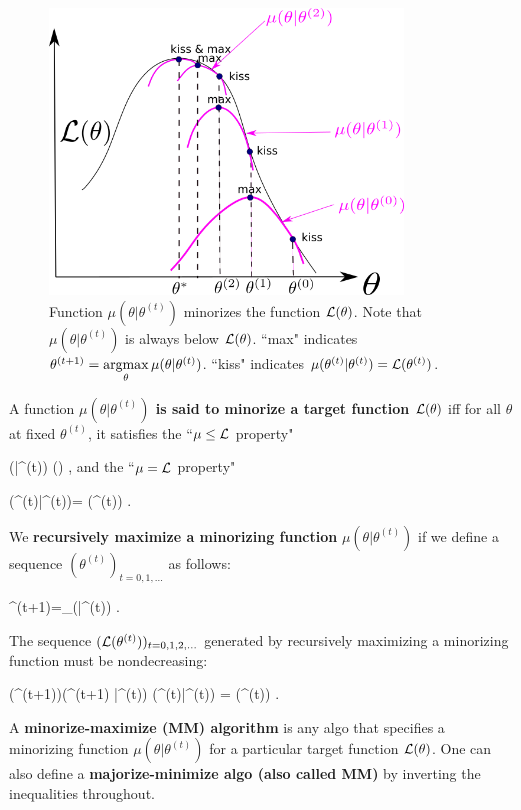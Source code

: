 \begin{figure}[h!]
\centering
\includegraphics[width=3.7in]
{emax/minorize.png}
\caption{Function $\mu(\theta|\theta^{(t)})$
minorizes the function ${\cal L}(\theta)$.
Note that $\mu(\theta|\theta^{(t)})$
is always below
 ${\cal L}(\theta)$.
``max" indicates 
$\theta^{(t+1)}=
\mathop{\mathrm{argmax}}\limits_\theta \mu(\theta|\theta^{(t)})$.
``kiss" indicates
 $\mu(\theta^{(t)}|\theta^{(t)})=
{\cal L}(\theta^{(t)})$. 
}
\label{fig-minorize}
\end{figure}



A function {\bf $\mu(\theta|\theta^{(t)})$ 
is said to minorize 
 a target
 function ${\cal L}(\theta)$}
iff for all $ \theta$ at fixed 
$\theta^{(t)}$,
it satisfies the
``$\mu\leq{\cal L}$ property"


\beq
\mu(\theta|\theta^{(t)})\leq
\call(\theta)
\;,
\eeq
and
the ``$\mu={\cal L}$ property"

\beq
\mu(\theta^{(t)}|\theta^{(t)})=
\call(\theta^{(t)})
\;.
\eeq

We  {\bf recursively maximize a minorizing function} $\mu(\theta|\theta^{(t)})$
if we define a sequence $(\theta^{(t)})_{t=0, 1, \ldots}$
as follows:

\beq
\theta^{(t+1)}=\argmax_\theta \mu(\theta|\theta^{(t)})
\;.
\eeq

The sequence 
$({\cal L}(\theta^{(t)}))_{t=0, 1, 2, \ldots}$
generated by 
recursively maximizing a minorizing function
must be nondecreasing:

\beq
\call(\theta^{(t+1)})\geq \mu(\theta^{(t+1)}
|\theta^{(t)})\geq
 \mu(\theta^{(t)}|\theta^{(t)}) 
= \call(\theta^{(t)})
\;.
\eeq

A {\bf
minorize-maximize (MM) algorithm}
is any algo that
specifies a
minorizing function $\mu(\theta|\theta^{(t)})$
for a particular target
 function ${\cal L}(\theta)$.
One can also define a 
{\bf majorize-minimize algo (also
called  MM)}
by inverting the inequalities throughout.


